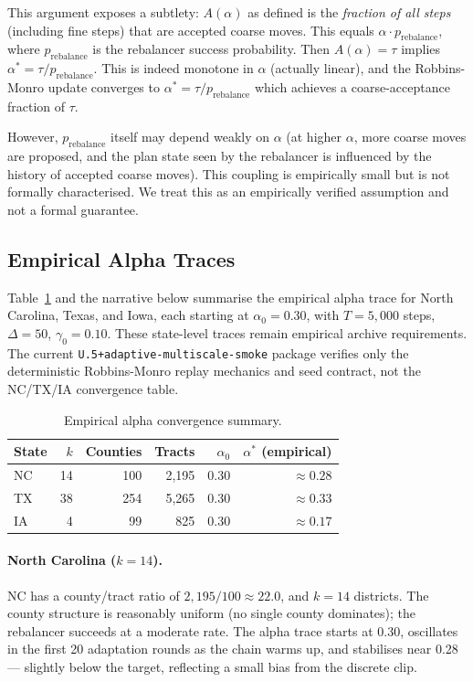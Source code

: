 This argument exposes a subtlety: $A(\alpha)$ as defined is the
\emph{fraction of all steps} (including fine steps) that are accepted coarse
moves.
This equals $\alpha \cdot p_{\text{rebalance}}$, where $p_{\text{rebalance}}$
is the rebalancer success probability.
Then $A(\alpha) = \tau$ implies $\alpha^* = \tau / p_{\text{rebalance}}$.
This is indeed monotone in $\alpha$ (actually linear), and the Robbins-Monro
update converges to $\alpha^* = \tau / p_{\text{rebalance}}$ which achieves
a coarse-acceptance fraction of $\tau$.

However, $p_{\text{rebalance}}$ itself may depend weakly on $\alpha$ (at
higher $\alpha$, more coarse moves are proposed, and the plan state seen by
the rebalancer is influenced by the history of accepted coarse moves).
This coupling is empirically small but is not formally characterised.
We treat this as an empirically verified assumption and not a formal guarantee.

\subsection{Empirical Alpha Traces}

Table~\ref{tab:alpha-convergence} and the narrative below summarise the
empirical alpha trace for North Carolina, Texas, and Iowa, each starting at
$\alpha_0 = 0.30$, with $T = 5{,}000$ steps, $\Delta = 50$, $\gamma_0 = 0.10$.
These state-level traces remain empirical archive requirements.  The current
\texttt{U.5+adaptive-multiscale-smoke} package verifies only the deterministic
Robbins-Monro replay mechanics and seed contract, not the NC/TX/IA convergence
table.

\begin{table}[h]
  \centering
  \caption{Empirical alpha convergence summary.}
  \label{tab:alpha-convergence}
  \begin{tabular}{lrrrrr}
    \toprule
    State & $k$ & Counties & Tracts & $\alpha_0$ & $\alpha^*$ (empirical) \\
    \midrule
    NC & 14 & 100 & 2{,}195 & 0.30 & $\approx 0.28$ \\
    TX & 38 & 254 & 5{,}265 & 0.30 & $\approx 0.33$ \\
    IA &  4 &  99 &   825 & 0.30 & $\approx 0.17$ \\
    \bottomrule
  \end{tabular}
\end{table}

\paragraph{North Carolina ($k = 14$).}
NC has a county/tract ratio of $2{,}195 / 100 \approx 22.0$, and $k = 14$
districts.
The county structure is reasonably uniform (no single county dominates);
the rebalancer succeeds at a moderate rate.
The alpha trace starts at 0.30, oscillates in the first 20 adaptation rounds
as the chain warms up, and stabilises near 0.28 --- slightly below the target,
reflecting a small bias from the discrete clip.

